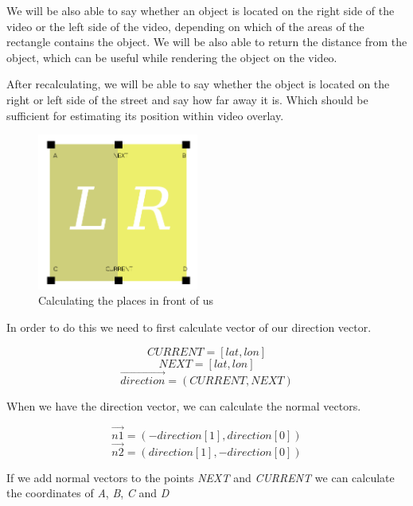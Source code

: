 \documentclass[journal]{IEEEtran}
\begin{document}
We will be also able to say whether an object is located on the right side of the video or the left side of the video, depending on which of the areas of the rectangle contains the object. We will be also able to return the distance from the object, which can be useful while rendering the object on the video.

After recalculating, we will be able to say whether the object is located on the right or left side of the street and say how far away it is. Which should be sufficient for estimating its position within video overlay.

        \begin{figure}[htb]
         \centering
         \includegraphics[width=200px]{filtering}
         \caption{Calculating the places in front of us}
         \label{filtering}
        \end{figure}
        
In order to do this we need to first calculate vector of our direction vector.

\begin{displaymath}
CURRENT = [lat, lon]
\end{displaymath}
\begin{displaymath}
NEXT = [lat, lon]
\end{displaymath}
\begin{displaymath}
\vec{direction} = (CURRENT, NEXT)
\end{displaymath}

When we have the direction vector, we can calculate the normal vectors.

\begin{displaymath}
\vec{n1} = (-direction[1], direction[0])
\end{displaymath}
\begin{displaymath}
\vec{n2} = (direction[1], -direction[0])
\end{displaymath}

If we add normal vectors to the points \textit{NEXT} and \textit{CURRENT} we can calculate the coordinates of \textit{A}, \textit{B}, \textit{C} and \textit{D}
\end{document}
